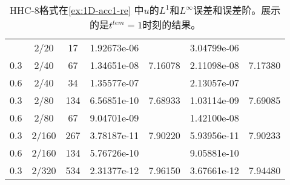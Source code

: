 \begin{table}[htbp]
	\caption{HHC-8格式在\cref{ex:1D-acc1-re} 中$u$的$L^1$和$L^\infty$误差和误差阶。展示的是$t^{tem} = 1$时刻的结果。}
	\label{ta:1D-ex1-HHC8}
	\centering
	\begin{tabular}{ccccccc}
		\toprule
		\titleintable
		\midrule
		0.6 & 2/20  & 17  & 1.92673e-06 &         & 3.04799e-06 &         \\
		0.3 & 2/40  & 67  & 1.34651e-08 & 7.16078 & 2.11098e-08 & 7.17380 \\
		\midrule
		0.6 & 2/40  & 34  & 1.35577e-07 &         & 2.13057e-07 &         \\
		0.3 & 2/80  & 134 & 6.56851e-10 & 7.68933 & 1.03114e-09 & 7.69085 \\
		\midrule
		0.6 & 2/80  & 67  & 9.04701e-09 &         & 1.42100e-08 &         \\
		0.3 & 2/160 & 267 & 3.78187e-11 & 7.90220 & 5.93956e-11 & 7.90233 \\
		\midrule
		0.6 & 2/160 & 134 & 5.76726e-10 &         & 9.05881e-10 &         \\
		0.3 & 2/320 & 534 & 2.31377e-12 & 7.96150 & 3.67661e-12 & 7.94480 \\
		\bottomrule
	\end{tabular}
\end{table}
\undef\titleintable
